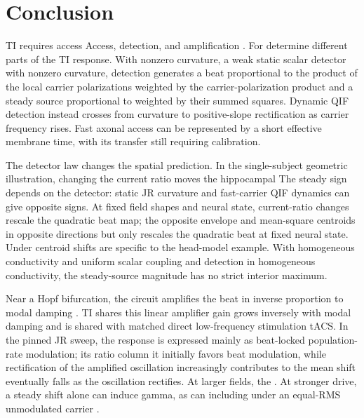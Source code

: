 \documentclass[11pt,a4paper]{article}
\providecommand{\DIFaddtex}[1]{{\protect\color{blue} \sf #1}} %
\providecommand{\DIFdeltex}[1]{{\protect\color{red} \scriptsize #1}} %
\providecommand{\DIFaddbegin}{} %
\providecommand{\DIFaddend}{} %
\providecommand{\DIFdelbegin}{} %
\providecommand{\DIFdelend}{} %
\providecommand{\DIFadd}[1]{\texorpdfstring{\DIFaddtex{#1}}{#1}} %
\providecommand{\DIFdel}[1]{\texorpdfstring{\DIFdeltex{#1}}{}} %
\begin{document}
\DIFaddbegin \FloatBarrier
\DIFaddend \section{Conclusion}
\DIFdelbegin \DIFdel{TI requires access}\DIFdelend \DIFaddbegin \DIFadd{Access}\DIFaddend , detection, and amplification \DIFdelbegin \DIFdel{. For }\DIFdelend \DIFaddbegin \DIFadd{determine different parts of the TI response. With nonzero curvature, }\DIFaddend a weak static
scalar detector \DIFdelbegin \DIFdel{with nonzero curvature, detection }\DIFdelend generates a beat \DIFdelbegin \DIFdel{proportional
to the product of the local carrier polarizations }\DIFdelend \DIFaddbegin \DIFadd{weighted by the carrier-polarization product
}\DIFaddend and a steady source \DIFdelbegin \DIFdel{proportional to }\DIFdelend \DIFaddbegin \DIFadd{weighted by }\DIFaddend their summed squares. \DIFdelbegin \DIFdel{Dynamic QIF detection instead crosses
from curvature to positive-slope rectification as carrier frequency rises.
Fast axonal access can be represented
by a short effective membrane time, with its transfer still requiring calibration. }%

\DIFdel{The detector law changes the spatial prediction. In the single-subject
geometric illustration, changing the current ratio moves the hippocampal
}\DIFdelend \DIFaddbegin \DIFadd{The steady sign depends on the detector: static JR
curvature and fast-carrier QIF dynamics can give opposite signs. At fixed
field shapes and neural state, current-ratio changes rescale the quadratic beat map; the opposite
}\DIFaddend envelope and mean-square \DIFdelbegin \DIFdel{centroids in opposite directions but only rescales the quadratic beat at fixed
neural state.
Under }\DIFdelend \DIFaddbegin \DIFadd{centroid shifts are specific to the head-model example.
With homogeneous conductivity and }\DIFaddend uniform scalar coupling and detection\DIFdelbegin \DIFdel{in homogeneous conductivity}\DIFdelend ,
the steady-source magnitude has no strict interior maximum.

Near a Hopf bifurcation, \DIFdelbegin \DIFdel{the circuit amplifies the beat in inverse proportion
to modal damping . TI shares this linear amplifier }\DIFdelend \DIFaddbegin \DIFadd{gain grows inversely with modal damping and is shared
}\DIFaddend with matched direct \DIFdelbegin \DIFdel{low-frequency stimulation}\DIFdelend \DIFaddbegin \DIFadd{tACS}\DIFaddend . In the pinned JR \DIFdelbegin \DIFdel{sweep, the response is expressed
mainly as beat-locked population-rate modulation; its ratio }\DIFdelend \DIFaddbegin \DIFadd{column it initially
favors beat modulation, while rectification of the amplified oscillation
increasingly contributes }\DIFaddend to the mean shift\DIFdelbegin \DIFdel{eventually falls
as the oscillation rectifies.
At larger fields, the }\DIFdelend \DIFaddbegin \DIFadd{.
At stronger drive, a }\DIFaddend steady shift alone can induce gamma, \DIFdelbegin \DIFdel{as can }\DIFdelend \DIFaddbegin \DIFadd{including under }\DIFaddend an
equal-RMS unmodulated carrier \DIFdelbegin \DIFdel{.
}%
\end{document}

